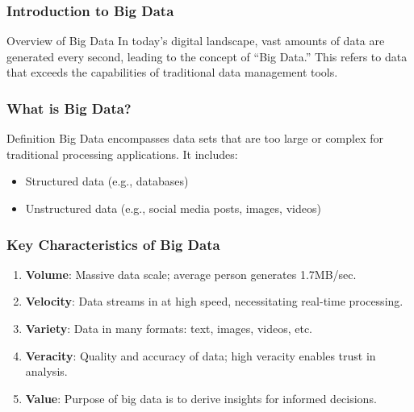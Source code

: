 \documentclass[aspectratio=169]{beamer}
\begin{document}
\frame{\titlepage}

\begin{frame}[fragile]
    \frametitle{Introduction to Big Data}
    \begin{block}{Overview of Big Data}
        In today’s digital landscape, vast amounts of data are generated every second, leading to the concept of “Big Data.” This refers to data that exceeds the capabilities of traditional data management tools.
    \end{block}
\end{frame}

\begin{frame}[fragile]
    \frametitle{What is Big Data?}
    \begin{block}{Definition}
        Big Data encompasses data sets that are too large or complex for traditional processing applications. It includes:
    \end{block}
    \begin{itemize}
        \item Structured data (e.g., databases)
        \item Unstructured data (e.g., social media posts, images, videos)
    \end{itemize}
\end{frame}

\begin{frame}[fragile]
    \frametitle{Key Characteristics of Big Data}
    \begin{enumerate}
        \item \textbf{Volume}: Massive data scale; average person generates 1.7MB/sec.
        \item \textbf{Velocity}: Data streams in at high speed, necessitating real-time processing.
        \item \textbf{Variety}: Data in many formats: text, images, videos, etc.
        \item \textbf{Veracity}: Quality and accuracy of data; high veracity enables trust in analysis.
        \item \textbf{Value}: Purpose of big data is to derive insights for informed decisions.
    \end{enumerate}
\end{frame}
\end{document}
